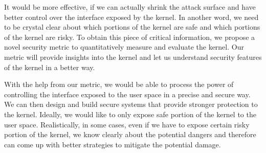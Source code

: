It would be more effective, if we can actually shrink the attack surface and have better control over 
the interface exposed by the kernel. In another word, we need to be crystal clear about which portions of 
the kernel are safe and which portions of the kernel are risky.
To obtain this piece of critical information, we
propose a novel security metric to quantitatively measure and evaluate the kernel. Our metric will provide
insights into the kernel and let us understand security features of the kernel in a better way. 

With the help from our metric, we would be able to process the power of controlling the interface 
exposed to the user space in a precise and secure way. We can then design and build secure systems 
that provide stronger protection to the kernel. Ideally, we would like to only expose safe portion 
of the kernel to the user space. Realistically, in some cases, even if we have to expose certain risky portion 
of the kernel, we know clearly about the potential dangers and therefore can come up with better 
strategies to mitigate the potential damage. 
